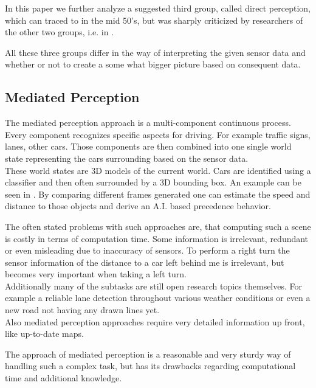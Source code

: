 In this paper we further analyze a suggested third group, called direct perception, which can traced to \cite{gibson1979ecological} in the mid 50's, but was sharply criticized by researchers of the other two groups, i.e. in \cite{ullman1980against}. %

All these three groups differ in the way of interpreting the given sensor data and whether or not to create a some what bigger picture based on consequent data.

\subsection{Mediated Perception} \label{subsec: Mediated Perception}

The mediated perception approach is a multi-component continuous process. Every component recognizes specific aspects for driving. For example traffic signs, lanes, other cars. Those components are then combined into one single world state representing the cars surrounding based on the sensor data. \cite{KITTI}\\
These world states are 3D models of the current world. Cars are identified using a classifier and then often surrounded by a 3D bounding box. An example can be seen in . By comparing different frames generated one can estimate the speed and distance to those objects and derive an A.I. based precedence behavior. \cite{KITTI}\cite{chen2015deepdriving}

The often stated problems with such approaches are, that computing such a scene is costly in terms of computation time. Some information is irrelevant, redundant or even misleading due to inaccuracy of sensors. To perform a right turn the sensor information of the distance to a car left behind me is irrelevant, but becomes very important when taking a left turn.\\
Additionally many of the subtasks are still open research topics themselves. For example a reliable lane detection throughout various weather conditions or even a new road not having any drawn lines yet. \cite{aly2008real}\\
Also mediated perception approaches require very detailed information up front, like up-to-date maps.

The approach of mediated perception is a reasonable and very sturdy way of handling such a complex task, but has its drawbacks regarding computational time and additional knowledge.

